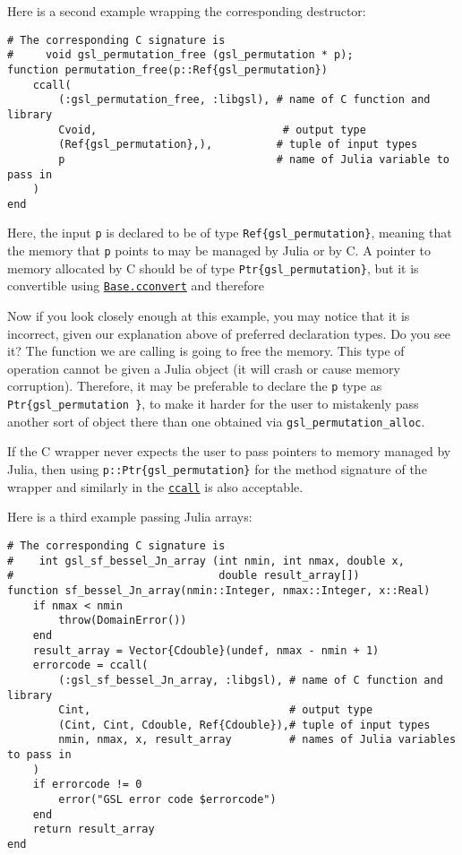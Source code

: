 Here is a second example wrapping the corresponding destructor:




\begin{verbatim}
# The corresponding C signature is
#     void gsl_permutation_free (gsl_permutation * p);
function permutation_free(p::Ref{gsl_permutation})
    ccall(
        (:gsl_permutation_free, :libgsl), # name of C function and library
        Cvoid,                             # output type
        (Ref{gsl_permutation},),          # tuple of input types
        p                                 # name of Julia variable to pass in
    )
end
\end{verbatim}



Here, the input \texttt{p} is declared to be of type \texttt{Ref\{gsl\_permutation\}}, meaning that the memory that \texttt{p} points to may be managed by Julia or by C. A pointer to memory allocated by C should be of type \texttt{Ptr\{gsl\_permutation\}}, but it is convertible using \hyperlink{16487788729383051927}{\texttt{Base.cconvert}} and therefore



Now if you look closely enough at this example, you may notice that it is incorrect, given our explanation above of preferred declaration types. Do you see it? The function we are calling is going to free the memory. This type of operation cannot be given a Julia object (it will crash or cause memory corruption). Therefore, it may be preferable to declare the \texttt{p} type as \texttt{Ptr\{gsl\_permutation \}}, to make it harder for the user to mistakenly pass another sort of object there than one obtained via \texttt{gsl\_permutation\_alloc}.



If the C wrapper never expects the user to pass pointers to memory managed by Julia, then using \texttt{p::Ptr\{gsl\_permutation\}} for the method signature of the wrapper and similarly in the \hyperlink{14245046751182637566}{\texttt{ccall}} is also acceptable.



Here is a third example passing Julia arrays:




\begin{verbatim}
# The corresponding C signature is
#    int gsl_sf_bessel_Jn_array (int nmin, int nmax, double x,
#                                double result_array[])
function sf_bessel_Jn_array(nmin::Integer, nmax::Integer, x::Real)
    if nmax < nmin
        throw(DomainError())
    end
    result_array = Vector{Cdouble}(undef, nmax - nmin + 1)
    errorcode = ccall(
        (:gsl_sf_bessel_Jn_array, :libgsl), # name of C function and library
        Cint,                               # output type
        (Cint, Cint, Cdouble, Ref{Cdouble}),# tuple of input types
        nmin, nmax, x, result_array         # names of Julia variables to pass in
    )
    if errorcode != 0
        error("GSL error code $errorcode")
    end
    return result_array
end
\end{verbatim}



